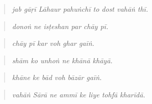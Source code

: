 \begin{tcolorbox}[breakable,skin=enhanced,colback=orange!6,colframe=orange!45!black,boxrule=0.5pt,arc=1mm,left=6pt,right=6pt,top=4pt,bottom=4pt,fonttitle=\bfseries,title={Read this}]
\begin{quote}
\textbf{       }
\end{quote}

\begin{quote}
\emph{jab gāṛī Lāhaur pahuṅchī to dost vahāṅ thī.}
\end{quote}

\begin{quote}
\textbf{     }
\end{quote}

\begin{quote}
\emph{donoṅ ne isṭeshan par chāy pī.}
\end{quote}

\begin{quote}
\textbf{     }
\end{quote}

\begin{quote}
\emph{chāy pī kar voh ghar gaīṅ.}
\end{quote}

\begin{quote}
\textbf{     }
\end{quote}

\begin{quote}
\emph{shām ko unhoṅ ne khānā khāyā.}
\end{quote}

\begin{quote}
\textbf{     }
\end{quote}

\begin{quote}
\emph{khāne ke bād voh bāzār gaīṅ.}
\end{quote}

\begin{quote}
\textbf{       }
\end{quote}

\begin{quote}
\emph{vahāṅ Sārā ne ammī ke liye tohfā kharīdā.}
\end{quote}

\begin{quote}
\textbf{      }
\end{quote}


\end{tcolorbox}
